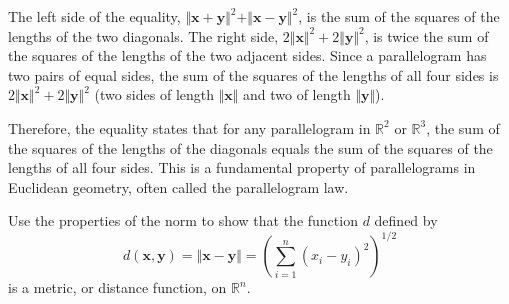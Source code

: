 \documentclass[10pt]{extarticle}
\begin{document}
\begin{solution}
    The left side of the equality, $\Vert\mathbf{x} + \mathbf{y}\Vert^2 + \Vert\mathbf{x} - \mathbf{y}\Vert^2$, is the sum of the squares of the lengths of the two diagonals. The right side, $2\Vert\mathbf{x}\Vert^2 + 2\Vert\mathbf{y}\Vert^2$, is twice the sum of the squares of the lengths of the two adjacent sides. Since a parallelogram has two pairs of equal sides, the sum of the squares of the lengths of all four sides is $2\Vert\mathbf{x}\Vert^2 + 2\Vert\mathbf{y}\Vert^2$ (two sides of length $\Vert\mathbf{x}\Vert$ and two of length $\Vert\mathbf{y}\Vert$).

    Therefore, the equality states that for any parallelogram in $\mathbb{R}^2$ or $\mathbb{R}^3$, the sum of the squares of the lengths of the diagonals equals the sum of the squares of the lengths of all four sides. This is a fundamental property of parallelograms in Euclidean geometry, often called the parallelogram law.
\end{solution}

\begin{exercise}[4.1]
    Use the properties of the norm to show that the function $d$ defined by
    $$
        d(\mathbf{x}, \mathbf{y}) = \Vert \mathbf{x} - \mathbf{y} \Vert = \left(\sum_{i=1}^{n}(x_i - y_i)^2\right)^{1/2}
    $$
    is a metric, or distance function, on $\mathbb{R}^n$.
\end{exercise}
\end{document}
